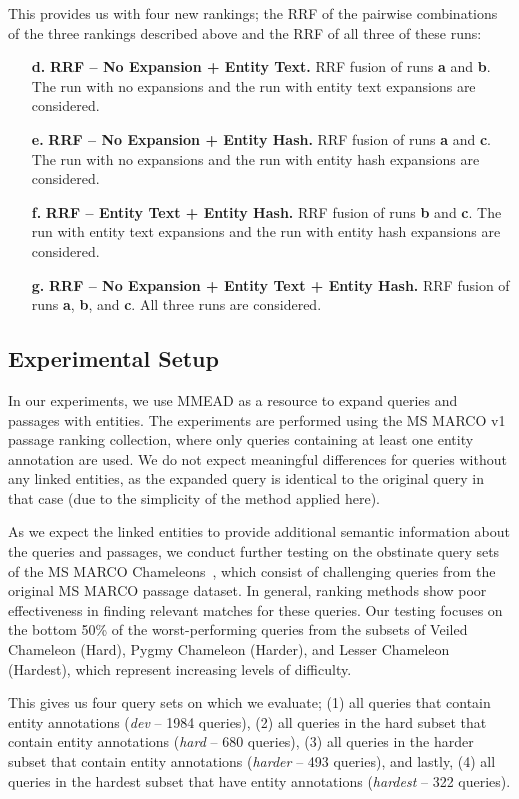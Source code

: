 This provides us with four new rankings; the RRF of the pairwise combinations of the three rankings described above and the RRF of all three of these runs:
\begin{itemize}
	\item[\textbf{d.}] \textbf{RRF -- No Expansion + Entity Text.} RRF fusion of runs \textbf{a} and \textbf{b}. The run with no expansions and the run with entity text expansions are considered.
	\item[\textbf{e.}] \textbf{RRF -- No Expansion + Entity Hash.} RRF fusion of runs \textbf{a} and \textbf{c}. The run with no expansions and the run with entity hash expansions are considered.
	\item[\textbf{f.}] \textbf{RRF -- Entity Text + Entity Hash.}  RRF fusion of runs \textbf{b} and \textbf{c}. The run with entity text expansions and the run with entity hash expansions are considered.
	\item[\textbf{g.}] \textbf{RRF -- No Expansion + Entity Text + Entity Hash.} RRF fusion of runs \textbf{a}, \textbf{b}, and \textbf{c}. All three runs are considered. 
\end{itemize}

\subsection{Experimental Setup}
In our experiments, we use MMEAD as a resource to expand queries and passages with entities. The experiments are performed using the MS MARCO v1 passage ranking collection, where only queries containing at least one entity annotation are used. We do not expect meaningful differences for queries without any linked entities, as the expanded query is identical to the original query in that case (due to the simplicity of the method applied here). 

As we expect the linked entities to provide additional semantic information about the queries and passages, we conduct further testing on the obstinate query sets of the MS MARCO Chameleons~\citep{chameleons}, which consist of challenging queries from the original MS MARCO passage dataset. In general, ranking methods show poor effectiveness in finding relevant matches for these queries. Our testing focuses on the bottom 50\% of the worst-performing queries from the subsets of Veiled Chameleon (Hard), Pygmy Chameleon (Harder), and Lesser Chameleon (Hardest), which represent increasing levels of difficulty. 

This gives us four query sets on which we evaluate; (1) all queries that contain entity annotations (\emph{dev} -- 1984 queries), (2) all queries in the hard subset that contain entity annotations (\emph{hard} -- 680 queries), (3) all queries in the harder subset that contain entity annotations (\emph{harder} -- 493 queries), and lastly, (4) all queries in the hardest subset that have entity annotations (\emph{hardest} -- 322 queries).

